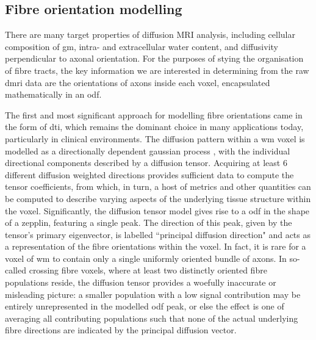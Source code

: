 \subsection{Fibre orientation modelling}


There are many target properties of diffusion MRI analysis, including cellular composition of \gls{gm}, intra- and extracellular water content, and diffusivity perpendicular to axonal orientation.
For the purposes of stying the organisation of fibre tracts, the key information we are interested in determining from the raw \gls{dmri} data are the orientations of axons inside each voxel, encapsulated mathematically in an \gls{odf}.

The first and most significant approach for modelling fibre orientations came in the form of \gls{dti}, which remains the dominant choice  in many applications today, particularly in clinical environments.
The diffusion pattern within a \gls{wm} voxel is modelled as a directionally dependent gaussian process , with the individual directional components described by a diffusion tensor.
Acquiring at least 6 different diffusion weighted directions provides sufficient data to compute the tensor coefficients, from which, in turn, a host of metrics and other quantities can be computed to describe varying aspects of the underlying tissue structure within the voxel. 
Significantly, the diffusion tensor model gives rise to a  \gls{odf} in the shape of a zepplin, featuring a single peak.
The direction of this peak, given by the tensor's primary eigenvector, is labelled ``principal diffusion direction" and acts as a representation of the fibre orientations within the voxel.
In fact, it is rare for a voxel of \gls{wm} to contain only a single uniformly oriented bundle of axons.
In so-called crossing fibre voxels, where at least two distinctly oriented fibre populations reside, the diffusion tensor provides a woefully inaccurate or misleading picture: a smaller population with a low signal contribution may be entirely unrepresented in the modelled \gls{odf} peak, or else the effect is one of averaging all contributing populations such that none of the actual underlying fibre directions are indicated by the principal diffusion vector.

